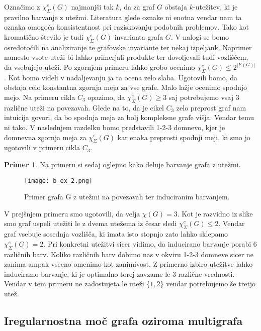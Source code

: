 \documentclass[12pt,a4paper,twoside]{article}
\theoremstyle{definition} %
\newtheorem{primer}[definicija]{Primer}
\theoremstyle{plain} %
\newcommand{\ec}{\chi_{\Sigma}^e}
\numberwithin{equation}{section}  %
\begin{document}
Označimo z $\ec(G)$ najmanjši tak $k$, da za graf $G$ obstaja $k$-utežitev, ki je pravilno barvanje z utežmi. Literatura glede oznake ni enotna vendar nam ta oznaka omogoča konsistentnost pri raziskovanju podobnih problemov. Tako kot kromatično število je tudi $\ec(G)$ invarianta grafa $G$. V nalogi se bomo osredotočili na analiziranje te grafovske invariante ter nekaj izpeljank. Naprimer namesto vsote uteži bi lahko primerjali produkte ter dovoljevali tudi vozliščem, da vsebujejo uteži. Po zgornjem primeru lahko grobo ocenimo $\ec(G) \le 2^{|E(G)|}$. Kot bomo videli v nadaljevanju ja ta ocena zelo slaba. Ugotovili bomo, da obstaja celo konstantna zgornja meja za vse grafe. Malo lažje ocenimo spodnjo mejo. Na primeru cikla $C_3$ opazimo, da $\ec(G) \ge 3$ saj potrebujemo vsaj 3 različne uteži na povezavah. Glede na to, da je cikel $C_3$ zelo preprost graf nam intuicija govori, da bo spodnja meja za bolj kompleksne grafe višja. Vendar temu ni tako. V naslednjem razdelku bomo predstavili 1-2-3 domnevo, kjer je domnevna zgornja meja za $\ec(G)$ kar enaka preprosti spodnji meji, ki smo jo ugotovili v primeru cikla $C_3$.

\begin{primer}
Na primeru si sedaj oglejmo kako deluje barvanje grafa z utežmi.
 \begin{figure}[h!]
\caption{Primer grafa G z utežmi na povezavah ter induciranim barvanjem.}
\label{basic_ex1}
\centering
    \texttt{[image: b\_ex\_2.png]}
    \end{figure}
V prejšnjem primeru smo ugotovili, da velja $\chi(G) = 3$. Kot je razvidno iz slike smo graf uspeli utežiti le z dvema utežema iz česar sledi $\ec(G) \le 2$. Vendar graf vsebuje sosednja vozlišča, ki imata isto stopnjo zato lahko sklepamo $\ec(G) = 2$. Pri konkretni utežitvi sicer vidimo, da inducirano barvanje porabi $6$ različnih barv. Koliko različnih barv dobimo nas v okviru 1-2-3 domneve sicer ne zanima ampak vseeno omenimo kot zanimivost. Z primerno izbiro utežitve lahko induciramo barvanje, ki je optimalno torej zavzame le $3$ različne vrednosti. Vendar v tem primeru ne zadostujeta le uteži $\{1,2\}$ vendar potrebujemo še tretjo utež.
\end{primer}

\subsection{Iregularnostna moč grafa oziroma multigrafa}
\end{document}
